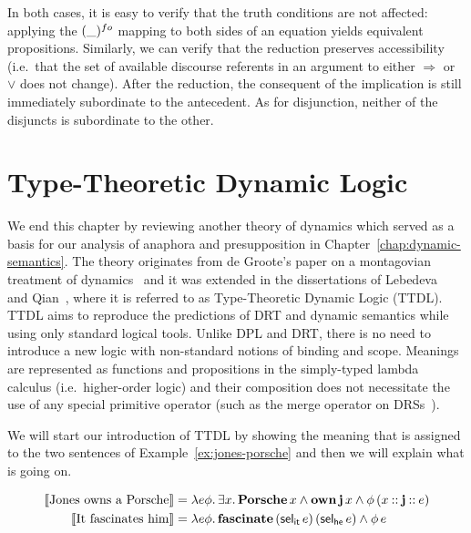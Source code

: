 In both cases, it is easy to verify that the truth conditions are not
affected: applying the $(\_)^{fo}$ mapping to both sides of an equation
yields equivalent propositions. Similarly, we can verify that the reduction
preserves accessibility (i.e.\ that the set of available discourse
referents in an argument to either $\Rightarrow$ or $\lor$ does not
change). After the reduction, the consequent of the implication is still
immediately subordinate to the antecedent. As for disjunction, neither of
the disjuncts is subordinate to the other.


\section{Type-Theoretic Dynamic Logic}
\label{sec:ttdl}

We end this chapter by reviewing another theory of dynamics which served as
a basis for our analysis of anaphora and presupposition in
Chapter~\ref{chap:dynamic-semantics}. The theory originates from de
Groote's paper on a montagovian treatment of dynamics~\cite{de2006towards}
and it was extended in the dissertations of
Lebedeva~\cite{lebedeva2012expression} and
Qian~\cite{qian2014accessibility}, where it is referred to as
Type-Theoretic Dynamic Logic (TTDL). TTDL aims to reproduce the predictions
of DRT and dynamic semantics while using only standard logical
tools. Unlike DPL and DRT, there is no need to introduce a new logic with
non-standard notions of binding and scope. Meanings are represented as
functions and propositions in the simply-typed lambda calculus (i.e.\
higher-order logic) and their composition does not necessitate the use of
any special primitive operator (such as the merge operator on
DRSs~\cite{muskens1996combining}).

We will start our introduction of TTDL by showing the meaning that is
assigned to the two sentences of Example~\ref{ex:jones-porsche} and then we
will explain what is going on.

\begin{align*}
\llbracket \text{Jones owns a Porsche} \rrbracket &=
\lambda e \phi.\, \exists x.\, \textbf{Porsche}\,x \land \textbf{own}\,\textbf{j}\,x
                          \land \phi\,(x \mathbin{::} \textbf{j} \mathbin{::} e) \\
\llbracket \text{It fascinates him} \rrbracket &= \lambda e \phi.\, \textbf{fascinate}\,(\textsf{sel}_{\textsf{it}}\,e)\,(\textsf{sel}_{\textsf{he}}\,e)
                                               \land \phi\,e
\end{align*}

